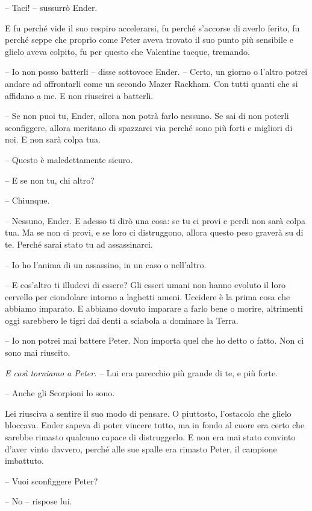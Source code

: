 {-- Taci! -- sussurrò Ender.}

{E fu perché vide il suo respiro accelerarsi, fu perché s'accorse di
	averlo ferito, fu perché seppe che proprio come Peter aveva trovato il
	suo punto più sensibile e glielo aveva colpito, fu per questo che
	Valentine tacque, tremando.}

{-- Io non posso batterli -- disse sottovoce Ender. -- Certo, un giorno
	o l'altro potrei andare ad affrontarli come un secondo Mazer Rackham.
	Con tutti quanti che si affidano a me. E non riuscirei a batterli.}

{-- Se non puoi tu, Ender, allora non potrà farlo nessuno. Se sai di non
	poterli sconfiggere, allora meritano di spazzarci via perché sono più
	forti e migliori di noi. E non sarà colpa tua.}

{-- Questo è maledettamente sicuro.}

{-- E se non tu, chi altro?}

{-- Chiunque.}

{-- Nessuno, Ender. E adesso ti dirò una cosa: se tu ci provi e perdi
	non sarà colpa tua. Ma se non ci provi, e se loro ci distruggono, allora
	questo peso graverà su di te. Perché sarai stato tu ad assassinarci.}

{-- Io ho l'anima di un assassino, in un caso o nell'altro.}

{-- E cos'altro ti illudevi di essere? Gli esseri umani non hanno
	evoluto il loro cervello per ciondolare intorno a laghetti ameni.
	Uccidere è la prima cosa che abbiamo imparato. E abbiamo dovuto imparare
	a farlo bene o morire, altrimenti oggi sarebbero le tigri dai denti a
	sciabola a dominare la Terra.}

{-- Io non potrei mai battere Peter. Non importa quel che ho detto o
	fatto. Non ci sono mai riuscito.}

\emph{{E così torniamo a Peter. }}{-- Lui era parecchio più grande di
	te, e più forte.}

{-- Anche gli Scorpioni lo sono.}

{Lei riusciva a sentire il suo modo di pensare. O piuttosto, l'ostacolo
	che glielo bloccava. Ender sapeva di poter vincere tutto, ma in fondo al
	cuore era certo che sarebbe rimasto qualcuno capace di distruggerlo. E
	non era mai stato convinto d'aver vinto davvero, perché alle sue spalle
	era rimasto Peter, il campione imbattuto.}

{-- Vuoi sconfiggere Peter?}

{-- No -- rispose lui.}

